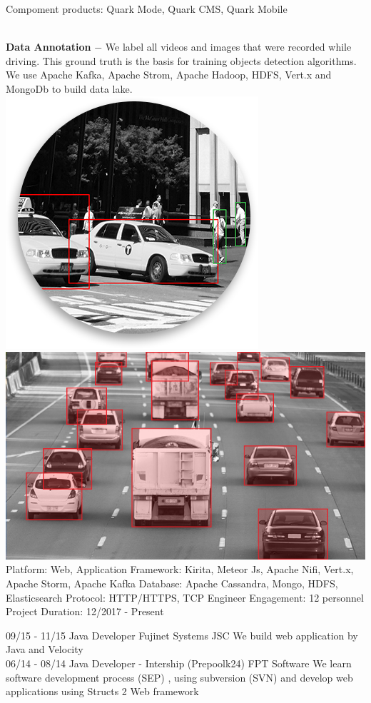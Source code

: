 \documentclass[]{friggeri-cv}
\begin{document}
\begin{entrylist}
{Compoment products: Quark Mode, Quark CMS, Quark Mobile

\\ \textbf{Data Annotation} $-$ We label all videos and images that were recorded while driving. This ground truth is the basis for training objects detection algorithms.\\
We use Apache Kafka, Apache Strom, Apache Hadoop, HDFS, Vert.x and MongoDb to build data lake.\\
\includegraphics[scale=0.3]{img/labeling_img_14.png}
\includegraphics[scale=0.3]{img/labeling_img_5_1.png}
Platform: Web, Application
Framework:  Kirita, Meteor Js, Apache Nifi,  Vert.x, Apache Storm, Apache Kafka  
Database: Apache Cassandra, Mongo, HDFS, Elasticsearch
Protocol: HTTP/HTTPS, TCP
Engineer Engagement: 12 personnel
Project Duration: 12/2017 - Present
	
}
  \entry
    {09/15 - 11/15}
    {Java Developer}
    {Fujinet Systems JSC}
    {We build web application by Java and Velocity\\}
    \entry
    {06/14 - 08/14}
    {Java Developer - Intership (Prepoolk24)}
    {FPT Software}
    {We learn software development process (SEP) , using subversion (SVN) and develop web applications using Structs 2 Web framework\\}
\end{entrylist}
\end{document}
